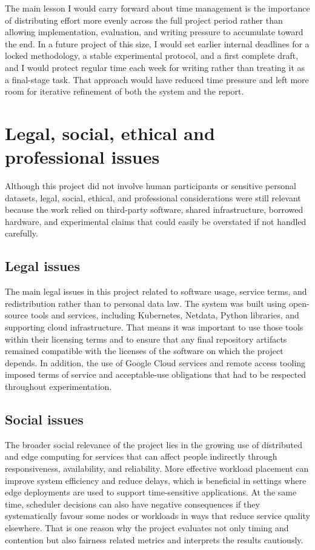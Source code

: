 \begin{appendices}
The main lesson I would carry forward about time management is the importance of distributing effort more evenly across the full project period rather than allowing implementation, evaluation, and writing pressure to accumulate toward the end. In a future project of this size, I would set earlier internal deadlines for a locked methodology, a stable experimental protocol, and a first complete draft, and I would protect regular time each week for writing rather than treating it as a final-stage task. That approach would have reduced time pressure and left more room for iterative refinement of both the system and the report.

\section{Legal, social, ethical and professional issues}

Although this project did not involve human participants or sensitive personal datasets, legal, social, ethical, and professional considerations were still relevant because the work relied on third-party software, shared infrastructure, borrowed hardware, and experimental claims that could easily be overstated if not handled carefully.

\subsection{Legal issues}

The main legal issues in this project related to software usage, service terms, and redistribution rather than to personal data law. The system was built using open-source tools and services, including Kubernetes, Netdata, Python libraries, and supporting cloud infrastructure. That means it was important to use those tools within their licensing terms and to ensure that any final repository artifacts remained compatible with the licenses of the software on which the project depends. In addition, the use of Google Cloud services and remote access tooling imposed terms of service and acceptable-use obligations that had to be respected throughout experimentation.

\subsection{Social issues}

The broader social relevance of the project lies in the growing use of distributed and edge computing for services that can affect people indirectly through responsiveness, availability, and reliability. More effective workload placement can improve system efficiency and reduce delays, which is beneficial in settings where edge deployments are used to support time-sensitive applications. At the same time, scheduler decisions can also have negative consequences if they systematically favour some nodes or workloads in ways that reduce service quality elsewhere. That is one reason why the project evaluates not only timing and contention but also fairness related metrics and interprets the results cautiously.


\end{appendices}

